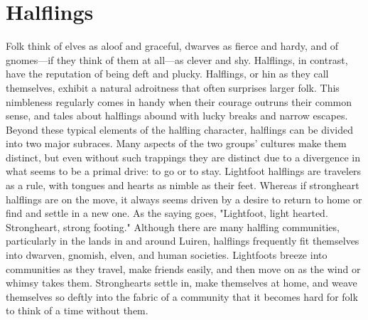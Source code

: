 \documentclass[10pt,a4paper,twoside,twocolumn,openany,bg=print,nodeprecatedcode]{dndbook}
\begin{document}
\section{Halflings}
Folk think of elves as aloof and graceful, dwarves as fierce and hardy, and of gnomes—if they think of them at all—as clever and shy. Halflings, in contrast, have the reputation of being deft and plucky.
Halflings, or hin as they call themselves, exhibit a natural adroitness that often surprises larger folk. This nimbleness regularly comes in handy when their courage outruns their common sense, and tales about halflings abound with lucky breaks and narrow escapes.
Beyond these typical elements of the halfling character, halflings can be divided into two major subraces. Many aspects of the two groups' cultures make them distinct, but even without such trappings they are distinct due to a divergence in what seems to be a primal drive: to go or to stay. Lightfoot halflings are travelers as a rule, with tongues and hearts as nimble as their feet. Whereas if strongheart halflings are on the move, it always seems driven by a desire to return to home or find and settle in a new one. As the saying goes, "Lightfoot, light hearted. Strongheart, strong footing."
Although there are many halfling communities, particularly in the lands in and around Luiren, halflings frequently fit themselves into dwarven, gnomish, elven, and human societies. Lightfoots breeze into communities as they travel, make friends easily, and then move on as the wind or whimsy takes them. Stronghearts settle in, make themselves at home, and weave themselves so deftly into the fabric of a community that it becomes hard for folk to think of a time without them.
\end{document}
